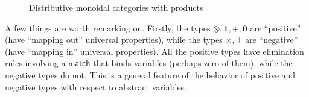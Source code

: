 \documentclass{book}
\def\idfunc{\mathsf{id}}
\let\types\vdash
\def\type{\;\ftype}
\def\unit{\top}%
\def\ttt{\mathord{\ast}}%
\def\timesE{\ensuremath{\mathord{\times}E}}
\def\timesI{\ensuremath{\mathord{\times}I}}
\def\pair#1#2{\langle #1,#2\rangle}
\def\pr#1#2#3{\pi_{#1}^{#2,#3}}
\def\plusE{\mathord{+}E}
\def\plusI{\mathord{+}I}
\def\inl{\mathsf{inl}}
\def\inr{\mathsf{inr}}
\def\acase#1#2{\mathsf{match}_{#1+#2}}
\def\match{\mathsf{match}}
\def\zero{\mathbf{0}}
\def\abort{\match_{\zero}}
\def\one{\mathbf{1}}
\def\ott{\mathord{\star}}%
\let\tensor\otimes
\def\tensorI{\mathord{\tensor}I}
\def\tensorE{\mathord{\tensor}E}
\def\tpair#1#2{\text{\textlquill} #1,#2 \text{\textrquill}}%
\begin{document}
\begin{figure}
  \centering
  \caption{Distributive monoidal categories with products}
  \label{fig:moncat-prod-coprod}
\end{figure}

A few things are worth remarking on.
Firstly, the types $\tensor,\one,+,\zero$ are ``positive'' (have ``mapping out'' universal properties), while the types $\times,\unit$ are ``negative'' (have ``mapping in'' universal properties).
All the positive types have elimination rules involving a $\match$ that binds variables (perhaps zero of them), while the negative types do not.
This is a general feature of the behavior of positive and negative types with respect to abstract variables.
\end{document}

